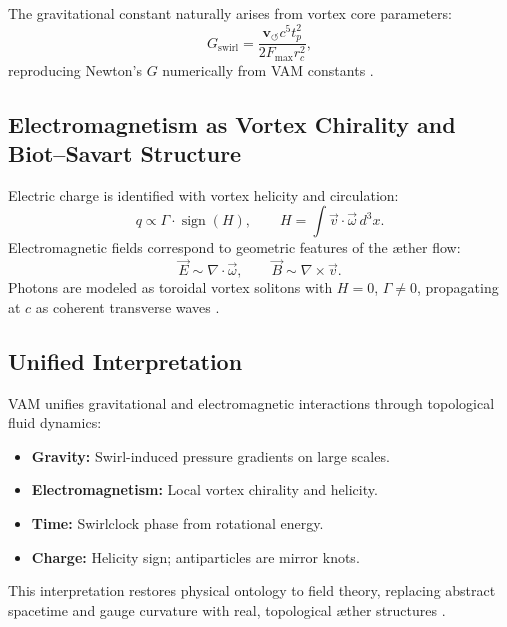 The gravitational constant naturally arises from vortex core parameters:
\begin{equation}
G_\text{swirl} = \frac{\mathbf{v}_{\scriptscriptstyle\boldsymbol{\circlearrowleft}} c^5 t_p^2}{2 F_{\text{max}} r_c^2},
\end{equation}
reproducing Newton's \( G \) numerically from VAM constants \cite{iskandarani2025vam2}.

\subsection{Electromagnetism as Vortex Chirality and Biot–Savart Structure}

Electric charge is identified with vortex helicity and circulation:
\begin{equation}
q \propto \Gamma \cdot \operatorname{sign}(H), \qquad H = \int \vec{v} \cdot \vec{\omega} \, d^3x.
\end{equation}
Electromagnetic fields correspond to geometric features of the æther flow:
\begin{equation}
\vec{E} \sim \nabla \cdot \vec{\omega}, \qquad \vec{B} \sim \nabla \times \vec{v}.
\end{equation}
Photons are modeled as toroidal vortex solitons with \( H = 0 \), \( \Gamma \neq 0 \), propagating at \( c \) as coherent transverse waves \cite{Battye1998, Ranada1989}.

\subsection{Unified Interpretation}

VAM unifies gravitational and electromagnetic interactions through topological fluid dynamics:
\begin{itemize}
  \item \textbf{Gravity:} Swirl-induced pressure gradients on large scales.
  \item \textbf{Electromagnetism:} Local vortex chirality and helicity.
  \item \textbf{Time:} Swirlclock phase from rotational energy.
  \item \textbf{Charge:} Helicity sign; antiparticles are mirror knots.
\end{itemize}

This interpretation restores physical ontology to field theory, replacing abstract spacetime and gauge curvature with real, topological æther structures \cite{iskandarani2025vam2}.

